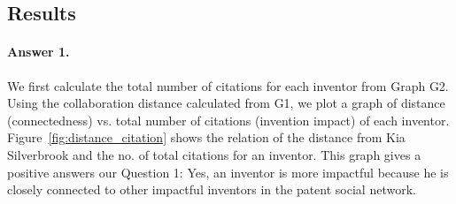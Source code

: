\subsection{Results}

\paragraph{Answer 1.}
We first calculate the total number of citations for each inventor from Graph G2. Using the collaboration distance calculated from G1, we plot a graph of distance (connectedness) vs. total number of citations (invention impact) of each inventor. 
Figure~\ref{fig:distance_citation} shows the relation of the distance from
Kia Silverbrook and the no. of total citations for an inventor. This graph gives a positive answers our Question 1: 
Yes, an inventor is more impactful because he is closely
connected to other impactful inventors in the patent social network.

